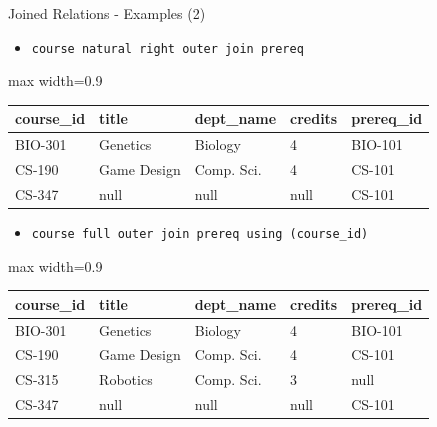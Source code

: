 \documentclass[aspectratio=169, xcolor=dvipsnames]{beamer}
\begin{document}
\begin{frame}[fragile]{Joined Relations - Examples (2)}
    \begin{itemize}
        \item \texttt{course natural right outer join prereq}
    \end{itemize}
    \begin{center}
        \begin{adjustbox}{max width=0.9\textwidth}
        \begin{tabular}{|l|l|l|l|l|}
        \hline
        \textbf{course\_id} & \textbf{title} & \textbf{dept\_name} & \textbf{credits} & \textbf{prereq\_id} \\ \hline
        BIO-301 & Genetics & Biology & 4 & BIO-101 \\ \hline
        CS-190 & Game Design & Comp. Sci. & 4 & CS-101 \\ \hline
        CS-347 & null & null & null & CS-101 \\ \hline
        \end{tabular}
        \end{adjustbox}
    \end{center}

    \vspace{0.5em}
    \begin{itemize}
        \item \texttt{course full outer join prereq using (course\_id)}
    \end{itemize}
    \begin{center}
        \begin{adjustbox}{max width=0.9\textwidth}
        \begin{tabular}{|l|l|l|l|l|}
        \hline
        \textbf{course\_id} & \textbf{title} & \textbf{dept\_name} & \textbf{credits} & \textbf{prereq\_id} \\ \hline
        BIO-301 & Genetics & Biology & 4 & BIO-101 \\ \hline
        CS-190 & Game Design & Comp. Sci. & 4 & CS-101 \\ \hline
        CS-315 & Robotics & Comp. Sci. & 3 & null \\ \hline
        CS-347 & null & null & null & CS-101 \\ \hline
        \end{tabular}
        \end{adjustbox}
    \end{center}
\end{frame}
\end{document}
